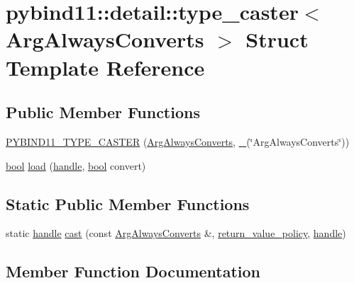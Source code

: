 \hypertarget{structpybind11_1_1detail_1_1type__caster_3_01_arg_always_converts_01_4}{}\section{pybind11\+::detail\+::type\+\_\+caster$<$ Arg\+Always\+Converts $>$ Struct Template Reference}
\label{structpybind11_1_1detail_1_1type__caster_3_01_arg_always_converts_01_4}
\subsection*{Public Member Functions}
\begin{DoxyCompactItemize}
\item 
\mbox{\hyperlink{structpybind11_1_1detail_1_1type__caster_3_01_arg_always_converts_01_4_a9e407d9e0d3f9219ece3bc4d3528d510}{P\+Y\+B\+I\+N\+D11\+\_\+\+T\+Y\+P\+E\+\_\+\+C\+A\+S\+T\+ER}} (\mbox{\hyperlink{class_arg_always_converts}{Arg\+Always\+Converts}}, \mbox{\hyperlink{descr_8h_af114703e20c6527e87163eb2798f74b8}{\+\_\+}}(\char`\"{}Arg\+Always\+Converts\char`\"{}))
\item 
\mbox{\hyperlink{asdl_8h_af6a258d8f3ee5206d682d799316314b1}{bool}} \mbox{\hyperlink{structpybind11_1_1detail_1_1type__caster_3_01_arg_always_converts_01_4_acce036ef7db0e53a63845fd0099d413c}{load}} (\mbox{\hyperlink{classhandle}{handle}}, \mbox{\hyperlink{asdl_8h_af6a258d8f3ee5206d682d799316314b1}{bool}} convert)
\end{DoxyCompactItemize}
\subsection*{Static Public Member Functions}
\begin{DoxyCompactItemize}
\item 
static \mbox{\hyperlink{classhandle}{handle}} \mbox{\hyperlink{structpybind11_1_1detail_1_1type__caster_3_01_arg_always_converts_01_4_a0460b48bf6a42ed52b101a889fdb4a91}{cast}} (const \mbox{\hyperlink{class_arg_always_converts}{Arg\+Always\+Converts}} \&, \mbox{\hyperlink{detail_2common_8h_adde72ab1fb0dd4b48a5232c349a53841}{return\+\_\+value\+\_\+policy}}, \mbox{\hyperlink{classhandle}{handle}})
\end{DoxyCompactItemize}


\subsection{Member Function Documentation}
\mbox{\label{structpybind11_1_1detail_1_1type__caster_3_01_arg_always_converts_01_4_a0460b48bf6a42ed52b101a889fdb4a91}} 
